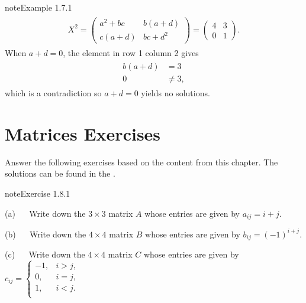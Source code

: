 \documentclass[letterpaper,10pt,english]{jupyterBook}
\begin{document}
\begin{sphinxadmonition}{note}{Example 1.7.1}
\begin{equation*}
\begin{split} \begin{align*}
    X^2 = \begin{pmatrix} a^2 + bc & b(a + d) \\ c(a + d) & bc + d^2 \end{pmatrix}
    =
    \begin{pmatrix} 4 & 3 \\ 0 & 1 \end{pmatrix}.
\end{align*} \end{split}
\end{equation*}
\sphinxAtStartPar
When \(a + d = 0\), the element in row 1 column 2 gives
\begin{equation*}
\begin{split} \begin{align*}
    b(a + d) &= 3 \\
    0 &\neq 3,
\end{align*} \end{split}
\end{equation*}
\sphinxAtStartPar
which is a contradiction so \(a + d=0\) yields no solutions.
\end{sphinxadmonition}

\sphinxstepscope


\section{Matrices Exercises}
\label{\detokenize{_pages/1.8_Matrices_exercises:matrices-exercises}}\label{\detokenize{_pages/1.8_Matrices_exercises::doc}}
\sphinxAtStartPar
Answer the following exercises based on the content from this chapter. The solutions can be found in the {\hyperref[\detokenize{_pages/A1_Matrices_exercises_solutions:matrices-exercises-solutions}]{}}.
 \label{exercise:matrices-ex1}

\begin{sphinxadmonition}{note}{Exercise 1.8.1}



\sphinxAtStartPar
(a)   Write down the \(3 \times 3\) matrix \(A\) whose entries are given by \(a_{ij} = i+j.\)

\sphinxAtStartPar
(b)   Write down the \(4 \times 4\) matrix \(B\) whose entries are given by \(b_{ij} = (-1)^{i+j}.\)

\sphinxAtStartPar
(c)   Write down the \(4 \times 4\) matrix \(C\) whose entries are given by \(
    c_{ij} = 
    \begin{cases}
    -1, & i>j, \\
    0, & i=j, \\
    1, & i<j. \\
    \end{cases} \)
\end{sphinxadmonition}
 \label{exercise:matrices-ex-hilbert}
\end{document}
